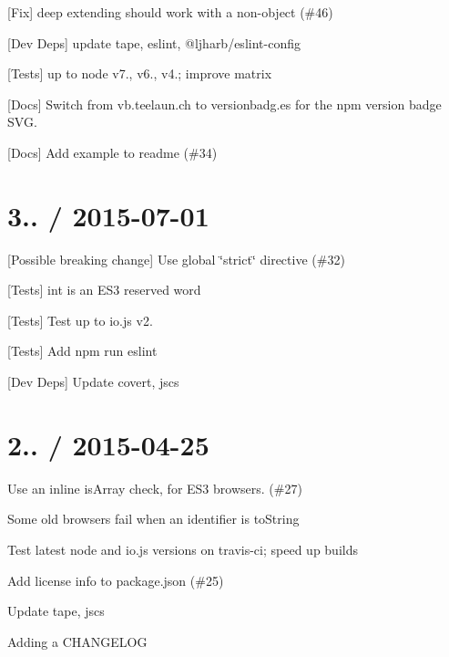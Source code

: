 
\begin{DoxyItemize}
\item \mbox{[}Fix\mbox{]} deep extending should work with a non-\/object (\#46)
\item \mbox{[}Dev Deps\mbox{]} update {\ttfamily tape}, {\ttfamily eslint}, {\ttfamily @ljharb/eslint-\/config}
\item \mbox{[}Tests\mbox{]} up to {\ttfamily node} {\ttfamily v7.}, {\ttfamily v6.}, {\ttfamily v4.}; improve matrix
\item \mbox{[}Docs\mbox{]} Switch from vb.\+teelaun.\+ch to versionbadg.\+es for the npm version badge S\+VG.
\item \mbox{[}Docs\mbox{]} Add example to readme (\#34)
\end{DoxyItemize}

\section*{3.. / 2015-\/07-\/01 }


\begin{DoxyItemize}
\item \mbox{[}Possible breaking change\mbox{]} Use global \char`\"{}strict\char`\"{} directive (\#32)
\item \mbox{[}Tests\mbox{]} {\ttfamily int} is an E\+S3 reserved word
\item \mbox{[}Tests\mbox{]} Test up to {\ttfamily io.\+js} {\ttfamily v2.}
\item \mbox{[}Tests\mbox{]} Add {\ttfamily npm run eslint}
\item \mbox{[}Dev Deps\mbox{]} Update {\ttfamily covert}, {\ttfamily jscs}
\end{DoxyItemize}

\section*{2.. / 2015-\/04-\/25 }


\begin{DoxyItemize}
\item Use an inline {\ttfamily is\+Array} check, for E\+S3 browsers. (\#27)
\item Some old browsers fail when an identifier is {\ttfamily to\+String}
\item Test latest {\ttfamily node} and {\ttfamily io.\+js} versions on {\ttfamily travis-\/ci}; speed up builds
\item Add license info to package.\+json (\#25)
\item Update {\ttfamily tape}, {\ttfamily jscs}
\item Adding a C\+H\+A\+N\+G\+E\+L\+OG
\end{DoxyItemize}

